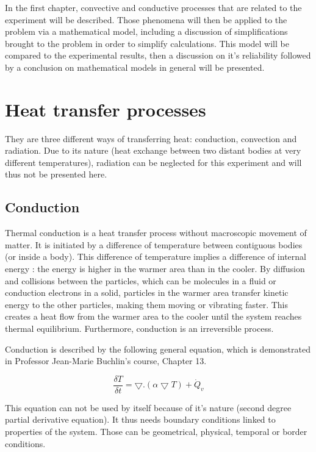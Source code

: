 \documentclass{report}
\begin{document}
	In the first chapter, convective and conductive processes that are related to the experiment will be described. Those phenomena will then be applied to the problem via a mathematical model, including a discussion of simplifications brought to the problem in order to simplify calculations. This model will be compared to the experimental results, then a discussion on it's reliability followed by a conclusion on mathematical models in general will be presented.
	
	\chapter{Heat transfer processes}\label{htp}
	
	They are three different ways of transferring heat: conduction, convection and radiation. Due to its nature (heat exchange between two distant bodies at very different temperatures), radiation can be neglected for this experiment and will thus not be presented here.
	
	\section{Conduction}\label{cd}
	
	Thermal conduction is a heat transfer process without macroscopic movement of matter. It is initiated by a difference of temperature between contiguous bodies (or inside a body). This difference of temperature implies a difference of internal energy : the energy is higher in the warmer area than in the cooler. By diffusion and collisions between the particles, which can be molecules in a fluid or conduction electrons in a solid, particles in the warmer area transfer kinetic energy to the other particles, making them moving or vibrating faster. This creates a heat flow from the warmer area to the cooler until the system reaches thermal equilibrium. Furthermore, conduction is an irreversible process.
	
	Conduction is described by the following general equation, which is demonstrated in Professor Jean-Marie Buchlin's course\cite{Buchlin}, Chapter 13.
	
	\begin{equation}
		\frac{\delta T}{\delta t} = \bigtriangledown . (\alpha \bigtriangledown T)+ \dot{Q}_v
	\end{equation}
	
	This equation can not be used by itself because of it's nature (second degree partial derivative equation). It thus needs boundary conditions linked to properties of the system. Those can be geometrical, physical, temporal or border conditions.
	
\end{document}
